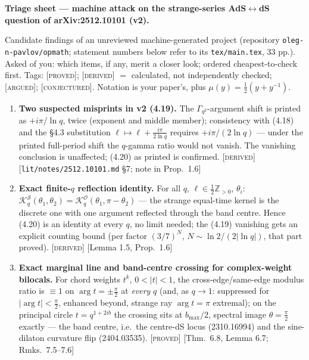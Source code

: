 \documentclass[10pt,a4paper]{article}
\newcommand{\PROVED}{{\color{ForestGreen}\textsc{[proved]}}}
\newcommand{\DERIVED}{{\color{teal}\textsc{[derived]}}}
\newcommand{\ARGUED}{{\color{orange}\textsc{[argued]}}}
\newcommand{\CONJ}{{\color{violet}\textsc{[conjectured]}}}
\newcommand{\K}{\mathcal{K}}
\newcommand{\Z}{\mathbb{Z}}
\newcommand{\loc}[1]{{\small[#1]}}
\begin{document}
\textbf{Triage sheet --- machine attack on the strange-series AdS$\leftrightarrow$dS question of arXiv:2512.10101 (v2).}

Candidate findings of an unreviewed machine-generated project (repository \texttt{oleg-n-pavlov/opmath}; statement numbers below refer to its \texttt{tex/main.tex}, 33 pp.). Asked of you: which items, if any, merit a closer look; ordered cheapest-to-check first. Tags: \PROVED; \DERIVED{} $=$ calculated, not independently checked; \ARGUED; \CONJ. Notation is your paper's, plus $\mu(y)=\tfrac12(y+y^{-1})$.

\begin{enumerate}[leftmargin=1.6em,itemsep=5pt,topsep=4pt]

\item \textbf{Two suspected misprints in v2 (4.19).} The $\Gamma_{q^{2}}$-argument shift is printed as $+i\pi/\ln q$, twice (exponent and middle member); consistency with (4.18) and the \S4.3 substitution $\ell\mapsto\ell+\tfrac{i\pi}{2\ln q}$ requires $+i\pi/(2\ln q)$ --- under the printed full-period shift the $q$-gamma ratio would not vanish. The vanishing conclusion is unaffected; (4.20) as printed is confirmed. \DERIVED{} \loc{\texttt{lit/notes/2512.10101.md} \S7; note in Prop.~1.6}

\item \textbf{Exact finite-$q$ reflection identity.} For all $q$, $\ell\in\tfrac12\Z_{>0}$, $\theta_i$: $\K^{\mathcal S}_{q}(\theta_1,\theta_2)=\K^{\mathcal O}_{q}(\theta_1,\pi-\theta_2)$ --- the strange equal-time kernel is the discrete one with one argument reflected through the band centre. Hence (4.20) is an identity at every $q$, no limit needed; the (4.19) vanishing gets an explicit counting bound (per factor $(3/7)^{N}$, $N\sim\ln2/(2|\ln q|)$, that part proved). \DERIVED{} \loc{Lemma 1.5, Prop.~1.6}

\item \textbf{Exact marginal line and band-centre crossing for complex-weight bilocals.} For chord weights $t^{k}$, $0<|t|<1$, the cross-edge/same-edge modulus ratio is $\equiv1$ on $\arg t=\pm\tfrac\pi2$ at \emph{every} $q$ (and, as $q\to1$: suppressed for $|\arg t|<\tfrac\pi2$, enhanced beyond, strange ray $\arg t=\pi$ extremal); on the principal circle $t=q^{1+2ib}$ the crossing sits at $b_{\max}/2$, spectral image $\theta=\tfrac\pi2$ exactly --- the band centre, i.e.\ the centre-dS locus (2310.16994) and the sine-dilaton curvature flip (2404.03535). \PROVED{} \loc{Thm.~6.8, Lemma 6.7; Rmks.~7.5--7.6}


\end{enumerate}
\end{document}
